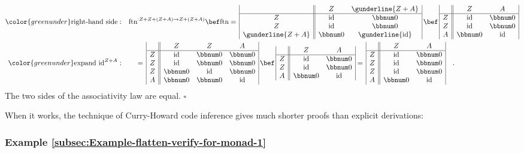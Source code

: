 \begin{align*}
{\color{greenunder}\text{right-hand side}:}\quad & \text{ftn}^{:Z+Z+\left(Z+A\right)\rightarrow Z+\left(Z+A\right)}\bef\text{ftn}=\,\begin{array}{|c||cc|}
 & Z & \gunderline{Z+A}\\
\hline Z & \text{id} & \bbnum 0\\
Z & \text{id} & \bbnum 0\\
\gunderline{Z+A} & \bbnum 0 & \gunderline{\text{id}}
\end{array}\,\bef\,\begin{array}{|c||cc|}
 & Z & A\\
\hline Z & \text{id} & \bbnum 0\\
Z & \text{id} & \bbnum 0\\
A & \bbnum 0 & \text{id}
\end{array}\\
{\color{greenunder}\text{expand }\text{id}^{Z+A}:}\quad & \quad=\,\begin{array}{|c||ccc|}
 & Z & Z & A\\
\hline Z & \text{id} & \bbnum 0 & \bbnum 0\\
Z & \text{id} & \bbnum 0 & \bbnum 0\\
Z & \bbnum 0 & \text{id} & \bbnum 0\\
A & \bbnum 0 & \bbnum 0 & \text{id}
\end{array}\,\bef\,\begin{array}{|c||cc|}
 & Z & A\\
\hline Z & \text{id} & \bbnum 0\\
Z & \text{id} & \bbnum 0\\
A & \bbnum 0 & \text{id}
\end{array}=\,\begin{array}{|c||cc|}
 & Z & A\\
\hline Z & \text{id} & \bbnum 0\\
Z & \text{id} & \bbnum 0\\
Z & \text{id} & \bbnum 0\\
A & \bbnum 0 & \text{id}
\end{array}\quad.
\end{align*}
The two sides of the associativity law are equal. $\square$

When it works, the technique of Curry-Howard code inference
gives much shorter proofs than explicit derivations:

\subsubsection{Example \label{subsec:Example-flatten-verify-for-monad-1}\ref{subsec:Example-flatten-verify-for-monad-1}}

